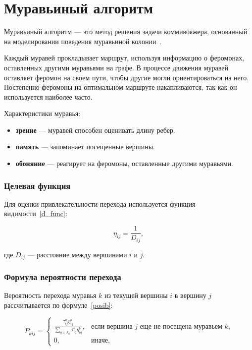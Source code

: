 \section{Муравьиный алгоритм}

Муравьиный алгоритм --- это метод решения задачи коммивояжера, основанный на моделировании поведения муравьиной колонии~\cite{ants}.

Каждый муравей прокладывает маршрут, используя информацию о феромонах, оставленных другими муравьями на графе. В процессе движения муравей оставляет феромон на своем пути, чтобы другие могли ориентироваться на него. Постепенно феромоны на оптимальном маршруте накапливаются, так как он используется наиболее часто.

Характеристики муравья:
\begin{itemize}
    \item \textbf{зрение} — муравей способен оценивать длину ребер.
    \item \textbf{память} — запоминает посещенные вершины.
    \item \textbf{обоняние} — реагирует на феромоны, оставленные другими муравьями.
\end{itemize}

\subsubsection*{Целевая функция}

Для оценки привлекательности перехода используется функция видимости~\eqref{d_func}:

\begin{equation}
    \label{d_func}
    \eta_{ij} = \frac{1}{D_{ij}},
\end{equation}

где $D_{ij}$ — расстояние между вершинами $i$ и $j$.

\subsubsection*{Формула вероятности перехода}

Вероятность перехода муравья $k$ из текущей вершины $i$ в вершину $j$ рассчитывается по формуле~\eqref{posib}:

\begin{equation}
    \label{posib}
    P_{kij} = 
    \begin{cases}
        \frac{\tau_{ij}^a \eta_{ij}^b}{\sum_{q \in J_{ik}} \tau_{iq}^a \eta_{iq}^b}, & \text{если вершина $j$ еще не посещена муравьем $k$,} \\
        0, & \text{иначе,}
    \end{cases}
\end{equation}


